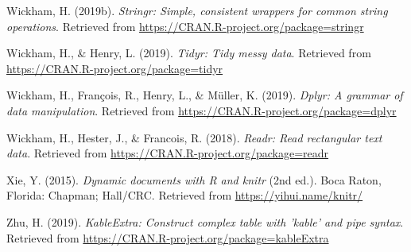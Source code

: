 \documentclass[man, fleqn, noextraspace,floatsintext]{apa6}
\begin{document}
\hypertarget{ref-R-stringr}{}
Wickham, H. (2019b). \emph{Stringr: Simple, consistent wrappers for
common string operations}. Retrieved from
\url{https://CRAN.R-project.org/package=stringr}

\hypertarget{ref-R-tidyr}{}
Wickham, H., \& Henry, L. (2019). \emph{Tidyr: Tidy messy data}.
Retrieved from \url{https://CRAN.R-project.org/package=tidyr}

\hypertarget{ref-R-dplyr}{}
Wickham, H., François, R., Henry, L., \& Müller, K. (2019). \emph{Dplyr:
A grammar of data manipulation}. Retrieved from
\url{https://CRAN.R-project.org/package=dplyr}

\hypertarget{ref-R-readr}{}
Wickham, H., Hester, J., \& Francois, R. (2018). \emph{Readr: Read
rectangular text data}. Retrieved from
\url{https://CRAN.R-project.org/package=readr}

\hypertarget{ref-R-knitr}{}
Xie, Y. (2015). \emph{Dynamic documents with R and knitr} (2nd ed.).
Boca Raton, Florida: Chapman; Hall/CRC. Retrieved from
\url{https://yihui.name/knitr/}

\hypertarget{ref-R-kableExtra}{}
Zhu, H. (2019). \emph{KableExtra: Construct complex table with 'kable'
and pipe syntax}. Retrieved from
\url{https://CRAN.R-project.org/package=kableExtra}

\endgroup

\clearpage

\renewcommand{\listfigurename}{Figure captions}

\listoffigures
\end{document}
